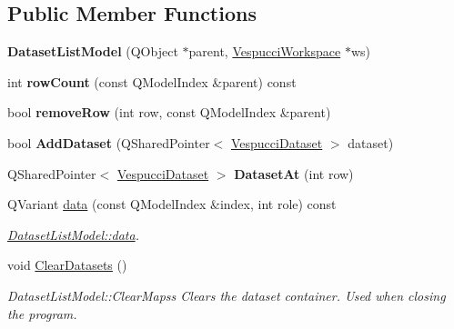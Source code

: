 \subsection*{Public Member Functions}
\begin{DoxyCompactItemize}
\item 
\hypertarget{class_dataset_list_model_a276029a6806e8aef718dd6c2aed05a06}{{\bfseries Dataset\+List\+Model} (Q\+Object $\ast$parent, \hyperlink{class_vespucci_workspace}{Vespucci\+Workspace} $\ast$ws)}\label{class_dataset_list_model_a276029a6806e8aef718dd6c2aed05a06}

\item 
\hypertarget{class_dataset_list_model_a03e20ece69419b89e5c048ec01272c94}{int {\bfseries row\+Count} (const Q\+Model\+Index \&parent) const }\label{class_dataset_list_model_a03e20ece69419b89e5c048ec01272c94}

\item 
\hypertarget{class_dataset_list_model_a4b31feaaf22d48d90ec70a8c20bb0d90}{bool {\bfseries remove\+Row} (int row, const Q\+Model\+Index \&parent)}\label{class_dataset_list_model_a4b31feaaf22d48d90ec70a8c20bb0d90}

\item 
\hypertarget{class_dataset_list_model_a9a186b0ff39cae3bb3b50fab95cd4e43}{bool {\bfseries Add\+Dataset} (Q\+Shared\+Pointer$<$ \hyperlink{class_vespucci_dataset}{Vespucci\+Dataset} $>$ dataset)}\label{class_dataset_list_model_a9a186b0ff39cae3bb3b50fab95cd4e43}

\item 
\hypertarget{class_dataset_list_model_af66b4812c85933aedd7fdccff61a98a0}{Q\+Shared\+Pointer$<$ \hyperlink{class_vespucci_dataset}{Vespucci\+Dataset} $>$ {\bfseries Dataset\+At} (int row)}\label{class_dataset_list_model_af66b4812c85933aedd7fdccff61a98a0}

\item 
Q\+Variant \hyperlink{class_dataset_list_model_af7ce31fef1181dd3e4cac94c754edd05}{data} (const Q\+Model\+Index \&index, int role) const 
\begin{DoxyCompactList}\small\item\em \hyperlink{class_dataset_list_model_af7ce31fef1181dd3e4cac94c754edd05}{Dataset\+List\+Model\+::data}. \end{DoxyCompactList}\item 
\hypertarget{class_dataset_list_model_a2839a86d8b45aaaefbbab118bc954ca0}{void \hyperlink{class_dataset_list_model_a2839a86d8b45aaaefbbab118bc954ca0}{Clear\+Datasets} ()}\label{class_dataset_list_model_a2839a86d8b45aaaefbbab118bc954ca0}

\begin{DoxyCompactList}\small\item\em Dataset\+List\+Model\+::\+Clear\+Mapss Clears the dataset container. Used when closing the program. \end{DoxyCompactList}\end{DoxyCompactItemize}


